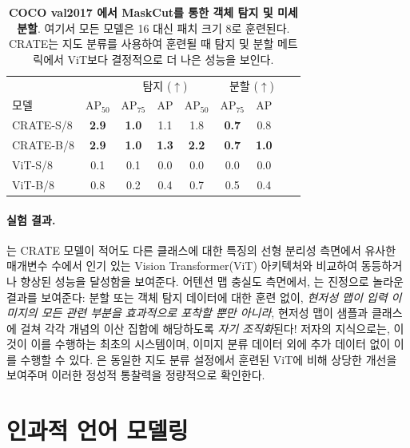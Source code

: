 \documentclass[../../book-main_ko.tex]{subfiles}
\begin{document}
\begin{table}
    \centering
    \begin{tabular}{@{}lcccccccc@{}}
    \toprule
     &  & \multicolumn{3}{c}{탐지 (\(\uparrow\))} &  \multicolumn{3}{c}{분할 (\(\uparrow\))} \\
    모델 & AP$_{50}$ & AP$_{75}$ & AP & AP$_{50}$ & AP$_{75}$ & AP  \\
    \midrule
    CRATE-S/8 & \textbf{2.9} & \textbf{1.0} & 1.1 & 1.8 & \textbf{0.7} & 0.8 \\
    CRATE-B/8 & \textbf{2.9} & \textbf{1.0} & \textbf{1.3} & \textbf{2.2} & \textbf{0.7} & \textbf{1.0} \\
    ViT-S/8 & 0.1& 0.1 & 0.0 & 0.0 & 0.0 & 0.0 \\
    ViT-B/8 & 0.8 & 0.2 & 0.4 & 0.7 & 0.5 & 0.4 \\
    \bottomrule
    \end{tabular}
    \caption{\small \textbf{COCO {val2017} \citep{lin2014microsoft}에서 MaskCut를 통한 객체 탐지 및 미세 분할}. 여기서 모든 모델은 16 대신 패치 크기 8로 훈련된다. CRATE는 지도 분류를 사용하여 훈련될 때 탐지 및 분할 메트릭에서 ViT보다 결정적으로 더 나은 성능을 보인다.}
    \label{tab:crate_detection_segmentation}
\end{table}

\paragraph{실험 결과.}

는 CRATE 모델이 적어도 다른 클래스에 대한 특징의 선형 분리성 측면에서 유사한 매개변수 수에서 인기 있는 Vision Transformer(ViT) 아키텍처와 비교하여 동등하거나 향상된 성능을 달성함을 보여준다. 어텐션 맵 충실도 측면에서, 는 진정으로 놀라운 결과를 보여준다: 분할 또는 객체 탐지 데이터에 대한 훈련 없이, \textit{현저성 맵이 입력 이미지의 모든 관련 부분을 효과적으로 포착할 뿐만 아니라}, 현저성 맵이 샘플과 클래스에 걸쳐 각각 개념의 이산 집합에 해당하도록 \textit{자기 조직화}된다! 저자의 지식으로는, 이것이 이를 수행하는 최초의 시스템이며, 이미지 분류 데이터 외에 추가 데이터 없이 이를 수행할 수 있다. 은 동일한 지도 분류 설정에서 훈련된 ViT에 비해 상당한 개선을 보여주며 이러한 정성적 통찰력을 정량적으로 확인한다.

\section{인과적 언어 모델링}\label{sec:clm_text}
\end{document}
